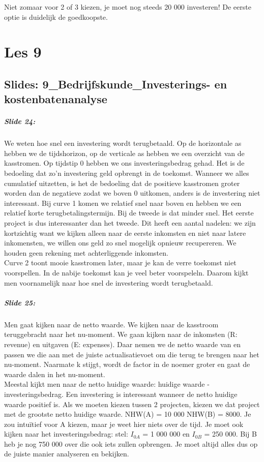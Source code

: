 \documentclass[10pt,a4paper]{report}
\begin{document}
Niet zomaar voor 2 of 3 kiezen, je moet nog steeds 20 000 investeren! De eerste optie is duidelijk de goedkoopste.

\chapter{Les 9}

\section{Slides: 9\_Bedrijfskunde\_Investerings- en kostenbatenanalyse}

\paragraph{Slide 24:} We weten hoe snel een investering wordt terugbetaald. Op de horizontale as hebben we de tijdshorizon, op de verticale as hebben we een overzicht van de kasstromen. Op tijdstip 0 hebben we ons investeringsbedrag gehad. Het is de bedoeling dat zo'n investering geld opbrengt in de toekomst. Wanneer we alles cumulatief uitzetten, is het de bedoeling dat de positieve kasstromen groter worden dan de negatieve zodat we boven 0 uitkomen, anders is de investering niet interessant. Bij curve 1 komen we relatief snel naar boven en hebben we een relatief korte terugbetalingstermijn. Bij de tweede is dat minder snel. Het eerste project is dus interessanter dan het tweede. Dit heeft een aantal nadelen: we zijn kortzichtig want we kijken alleen naar de eerste inkomsten en niet naar latere inkomensten, we willen ons geld zo snel mogelijk opnieuw recupereren. We houden geen rekening met achterliggende inkomsten.\\
Curve 2 toont mooie kasstromen later, maar je kan de verre toekomst niet voorspellen. In de nabije toekomst kan je veel beter voorspeleln. Daarom kijkt men voornamelijk naar hoe snel de investering wordt terugbetaald.

\paragraph{Slide 25:} Men gaat kijken naar de netto waarde. We kijken naar de kasstroom teruggebracht naar het nu-moment. We gaan kijken naar de inkomsten (R: revenue) en uitgaven (E: expenses). Daar nemen we de netto waarde van en passen we die aan met de juiste actualisatievoet om die terug te brengen naar het nu-moment. Naarmate k stijgt, wordt de factor in de noemer groter en gaat de waarde dalen in het nu-moment.\\
Meestal kijkt men naar de netto huidige waarde: huidige waarde - investeringsbedrag. Een investering is interessant wanneer de netto huidige waarde positief is. Als we moeten kiezen tussen 2 projecten, kiezen we dat project met de grootste netto huidige waarde. NHW(A) = 10 000 NHW(B) = 8000. Je zou intu\"itief voor A kiezen, maar je weet hier niets over de tijd. Je moet ook kijken naar het investeringsbedrag: stel: $I_{0A}$ = 1 000 000 en $I_{0B}$ = 250 000. Bij B heb je nog 750 000 over die ook iets zullen opbrengen. Je moet altijd alles dus op de juiste manier analyseren en bekijken.
\end{document}

